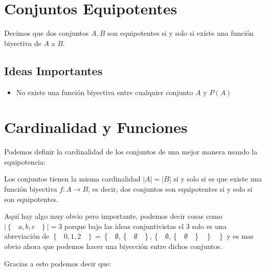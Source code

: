 \documentclass[12pt, fleqn]{report}                             %
\DeclareMathOperator \Space {\quad}                             %
\DeclareMathOperator \MiniSpace {\;}                            %
\newcommand{\Set}[1]{\left\{ \MiniSpace #1 \MiniSpace \right\}} %
\begin{document}
        \section{Conjuntos Equipotentes}

            Decimos que dos conjuntos $A, B$ son equipotentes si y solo si existe una función 
            biyectiva de $A$ a $B$.


            \subsection{Ideas Importantes}

                \begin{itemize}
                    \item No existe una función biyectiva entre cualquier conjunto $A$
                        y $P(A)$
                \end{itemize}

        \section{Cardinalidad y Funciones}

            Podemos definir la cardinalidad de los conjuntos de una mejor manera
            usando la equipotencia:

            Los conjuntos tienen la misma cardinalidad $|A| = |B|$ si y solo si es que existe
            una función biyectiva $f : A \to B$, es decir, dos conjuntos son equipotentes si y solo
            si son equipotentes.

            Aquí hay algo muy obvio pero importante, podemos decir cosas como
            $|\Set{a, b, c}| = 3$ porque bajo las ideas conjuntivistas el 3 solo es una abreviación
            de $\Set{0, 1, 2} = \Set{\emptyset, \Set{\emptyset}, \Set{\emptyset, \Set{\emptyset}}}$
            y es mas obvio ahora que podemos hacer una biyección entre dichos conjuntos. 

            Gracias a esto podemos decir que:
\end{document}
